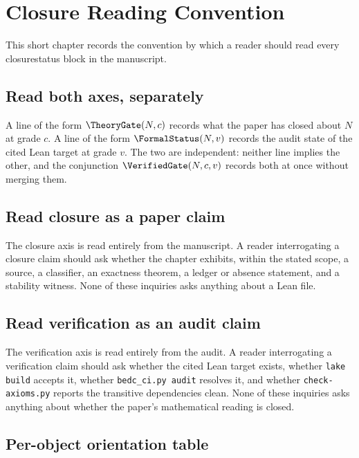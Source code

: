 \chapter{Closure Reading Convention}
\label{ch:closure-reading-convention}

This short chapter records the convention by which a reader should read every closurestatus block in the manuscript.

\section{Read both axes, separately}

A line of the form $\TheoryGate(N, c)$ records what the paper has closed about $N$ at grade $c$. A line of the form $\FormalStatus(N, v)$ records the audit state of the cited Lean target at grade $v$. The two are independent: neither line implies the other, and the conjunction $\VerifiedGate(N, c, v)$ records both at once without merging them.

\section{Read closure as a paper claim}

The closure axis is read entirely from the manuscript. A reader interrogating a closure claim should ask whether the chapter exhibits, within the stated scope, a source, a classifier, an exactness theorem, a ledger or absence statement, and a stability witness. None of these inquiries asks anything about a Lean file.

\section{Read verification as an audit claim}

The verification axis is read entirely from the audit. A reader interrogating a verification claim should ask whether the cited Lean target exists, whether \texttt{lake build} accepts it, whether \texttt{bedc\_ci.py audit} resolves it, and whether \texttt{check-axioms.py} reports the transitive dependencies clean. None of these inquiries asks anything about whether the paper's mathematical reading is closed.

\section{Per-object orientation table}

